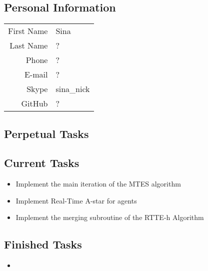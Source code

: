\subsection{Personal Information}
\begin{table}[h!]
	\begin{tabular}{rl}
	First Name 	& Sina\\
	Last Name	& ?\\
	Phone		& ?\\
	E-mail		& ?\\
	Skype		& sina\_nick\\
	GitHub		& ?
\end{tabular}
\end{table}

\subsection{Perpetual Tasks}

\subsection{Current Tasks}
\begin{itemize}
	\item Implement the main iteration of the MTES algorithm
	\item Implement Real-Time A-star for agents
	\item Implement the merging subroutine of the RTTE-h Algorithm
\end{itemize}

\subsection{Finished Tasks}
\begin{itemize}
	\item 
\end{itemize}